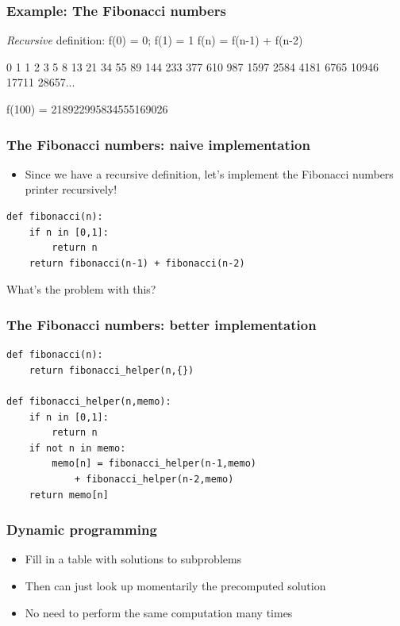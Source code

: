 \documentclass{beamer}
\begin{document}
\begin{frame}
\frametitle{Example: The Fibonacci numbers}

{\it Recursive} definition: f(0) = 0; f(1) = 1 f(n) = f(n-1) + f(n-2)

\vspace{1cm}

0 1 1 2 3 5 8 13 21 34 55 89 144 233 377 610 987 1597 2584 4181 6765 10946 17711 28657...

\vspace{1cm}

f(100) = 218922995834555169026

\end{frame}

\begin{frame}[fragile]
\frametitle{The Fibonacci numbers: naive implementation}

\begin{itemize}
\item Since we have a recursive definition, let's implement the Fibonacci numbers printer recursively!
\end{itemize}

\begin{verbatim}
def fibonacci(n):
    if n in [0,1]:
        return n
    return fibonacci(n-1) + fibonacci(n-2)
\end{verbatim}

What's the problem with this?

\end{frame}

\begin{frame}[fragile]
\frametitle{The Fibonacci numbers: better implementation}
\begin{verbatim}
def fibonacci(n):
    return fibonacci_helper(n,{})

def fibonacci_helper(n,memo):
    if n in [0,1]:
        return n
    if not n in memo:
        memo[n] = fibonacci_helper(n-1,memo) 
            + fibonacci_helper(n-2,memo)
    return memo[n]

\end{verbatim}
\end{frame}

\begin{frame}
\frametitle{Dynamic programming}

\begin{itemize}
\item Fill in a table with solutions to subproblems
\item Then can just look up momentarily the precomputed solution
\item No need to perform the same computation many times
\end{itemize}
\end{frame}
\end{document}
